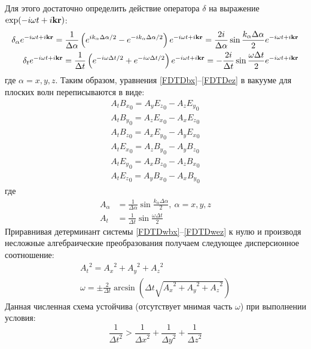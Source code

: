 Для этого достаточно определить действие оператора $\delta$ на выражение $\exp(-i\omega t + i \vb{kr})$:
\begin{align}
    \delta_\alpha e^{-i\omega t + i \vb{kr}} = \frac{1}{\Delta \alpha} \left( e^{i k_\alpha \Delta \alpha/2} - e^{-i k_\alpha \Delta \alpha/2} \right) e^{-i\omega t + i \vb{kr}} = \frac{2i}{\Delta \alpha} \sin{\frac{k_\alpha \Delta \alpha}{2}} e^{-i\omega t + i \vb{kr}}  \\
    \delta_t e^{-i\omega t + i \vb{kr}} = \frac{1}{\Delta t} \left( e^{-i \omega \Delta t/2} + e^{-i \omega \Delta t/2} \right) e^{-i\omega t + i \vb{kr}} = -\frac{2i}{\Delta t} \sin{\frac{\omega \Delta t}{2}} e^{-i\omega t + i \vb{kr}}
\end{align}
где $\alpha=x,y,z$.
Таким образом, уравнения \eqref{FDTDbx}--\eqref{FDTDez} в вакууме для плоских волн переписываются в виде:
\begin{align}
    \label{FDTDwbx}
    A_t {B_x}_0 = A_y{E_z}_0 - A_z{E_y}_0 \\
    \label{FDTDwby}
    A_t {B_y}_0 = A_z{E_x}_0 - A_x{E_z}_0 \\
    \label{FDTDwbz}
    A_t {B_z}_0 = A_x{E_y}_0 - A_y{E_x}_0 \\
    \label{FDTDwex}
    A_t {E_x}_0 = A_z{B_y}_0 - A_y{B_z}_0 \\
    \label{FDTDwey}
    A_t {E_y}_0 = A_x{B_z}_0 - A_z{B_x}_0 \\
    \label{FDTDwez}
    A_t {E_z}_0 = A_y{B_x}_0 - A_x{B_y}_0
\end{align}
где
\begin{align}
    A_\alpha &=\frac{1}{\Delta\alpha}\sin{\frac{k_\alpha\Delta \alpha}{2}},\ \alpha=x,y,z \\
    A_t &=\frac{1}{\Delta t}\sin{\frac{\omega\Delta t}{2}}
\end{align}
Приравнивая детерминант системы \eqref{FDTDwbx}--\eqref{FDTDwez} к нулю и производя несложные алгебраические преобразования получаем следующее дисперсионное соотношение:
\begin{gather}
    \label{FDTDdisp}
    {A_t}^2={A_x}^2+{A_y}^2+{A_z}^2 \\
    \label{FDTDomega}
    \omega = \pm \frac{2}{\Delta t} \arcsin{\left(\Delta t \sqrt{{A_x}^2+{A_y}^2+{A_z}^2} \right)}
\end{gather}
Данная численная схема устойчива (отсутствует мнимая часть $\omega$) при выполнении условия:
\begin{equation}
    \label{CournatFDTD}
    \frac{1}{{\Delta t}^2} > \frac{1}{{\Delta x}^2} + \frac{1}{{\Delta y}^2} + \frac{1}{{\Delta z}^2}
\end{equation}

